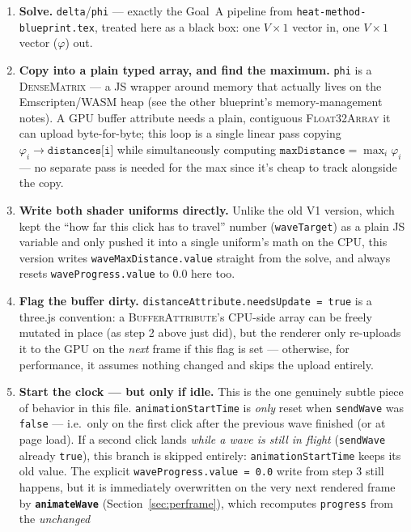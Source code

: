 \documentclass[11pt]{article}
\newcommand{\code}[1]{\texttt{#1}}
\newcommand{\func}[1]{\texttt{\textbf{#1}}}
\newcommand{\type}[1]{\textsc{#1}}
\begin{document}
\begin{enumerate}[leftmargin=1.6em]
\item \textbf{Solve.} \code{delta}/\code{phi} --- exactly the Goal~A pipeline from
  \code{heat-method-blueprint.tex}, treated here as a black box: one $V\times1$ vector in,
  one $V\times1$ vector ($\varphi$) out.
\item \textbf{Copy into a plain typed array, and find the maximum.} \code{phi} is a
  \type{DenseMatrix} --- a JS wrapper around memory that actually lives on the Emscripten/WASM
  heap (see the other blueprint's memory-management notes). A GPU buffer attribute needs a
  plain, contiguous \type{Float32Array} it can upload byte-for-byte; this loop is a single
  linear pass copying $\varphi_i \to \code{distances[i]}$ while simultaneously computing
  $\code{maxDistance} = \max_i \varphi_i$ --- no separate pass is needed for the max since
  it's cheap to track alongside the copy.
\item \textbf{Write both shader uniforms directly.} Unlike the old V1 version, which kept
  the ``how far this click has to travel'' number (\code{waveTarget}) as a plain JS
  variable and only pushed it into a single uniform's math on the CPU, this version writes
  \code{waveMaxDistance.value} straight from the solve, and always resets
  \code{waveProgress.value} to $0.0$ here too.
\item \textbf{Flag the buffer dirty.} \code{distanceAttribute.needsUpdate = true} is a
  three.js convention: a \type{BufferAttribute}'s CPU-side array can be freely mutated in
  place (as step 2 above just did), but the renderer only re-uploads it to the GPU on the
  \emph{next} frame if this flag is set --- otherwise, for performance, it assumes nothing
  changed and skips the upload entirely.
\item \textbf{Start the clock --- but only if idle.} This is the one genuinely subtle piece
  of behavior in this file. \code{animationStartTime} is \emph{only} reset when
  \code{sendWave} was \code{false} --- i.e.\ only on the first click after the previous wave
  finished (or at page load). If a second click lands \emph{while a wave is still in
  flight} (\code{sendWave} already \code{true}), this branch is skipped entirely:
  \code{animationStartTime} keeps its old value. The explicit
  \code{waveProgress.value = 0.0} write from step 3 still happens, but it is immediately
  overwritten on the very next rendered frame by \func{animateWave}
  (Section~\ref{sec:perframe}), which recomputes \code{progress} from the \emph{unchanged}

\end{enumerate}
\end{document}
